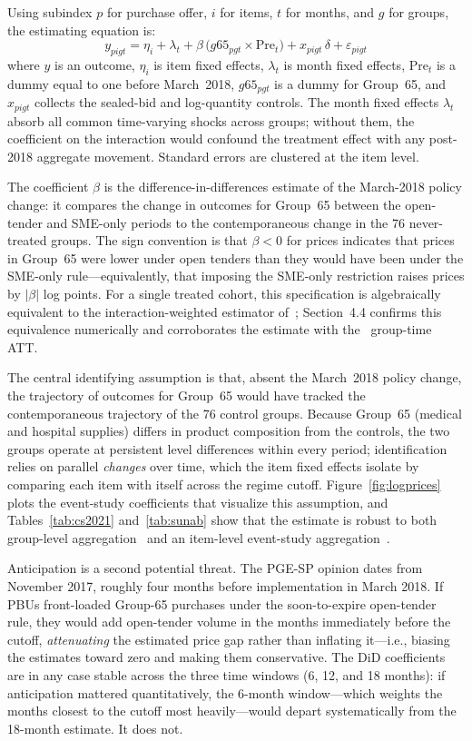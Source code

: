 Using subindex $p$ for purchase offer, $i$ for items, $t$ for months, and $g$ for groups, the estimating equation is:
\begin{equation}
y_{pigt} = \eta_i + \lambda_t + \beta\,\bigl(g65_{pgt}\times \text{Pre}_t\bigr) + x_{pigt}\,\delta + \varepsilon_{pigt}
\label{eq:did}
\end{equation}
where $y$ is an outcome, $\eta_i$ is item fixed effects, $\lambda_t$ is month fixed effects, $\text{Pre}_t$ is a dummy equal to one before March~2018, $g65_{pgt}$ is a dummy for Group~65, and $x_{pigt}$ collects the sealed-bid and log-quantity controls. The month fixed effects $\lambda_t$ absorb all common time-varying shocks across groups; without them, the coefficient on the interaction would confound the treatment effect with any post-2018 aggregate movement. Standard errors are clustered at the item level.

The coefficient $\beta$ is the difference-in-differences estimate of the March-2018 policy change: it compares the change in outcomes for Group~65 between the open-tender and SME-only periods to the contemporaneous change in the 76 never-treated groups. The sign convention is that $\beta < 0$ for prices indicates that prices in Group~65 were lower under open tenders than they would have been under the SME-only rule---equivalently, that imposing the SME-only restriction raises prices by $|\beta|$ log points. For a single treated cohort, this specification is algebraically equivalent to the interaction-weighted estimator of~\citet{sun2021}; Section~4.4 confirms this equivalence numerically and corroborates the estimate with the~\citet{callaway2021} group-time ATT.

The central identifying assumption is that, absent the March~2018 policy change, the trajectory of outcomes for Group~65 would have tracked the contemporaneous trajectory of the 76 control groups. Because Group~65 (medical and hospital supplies) differs in product composition from the controls, the two groups operate at persistent level differences within every period; identification relies on parallel \emph{changes} over time, which the item fixed effects isolate by comparing each item with itself across the regime cutoff. Figure~\ref{fig:logprices} plots the event-study coefficients that visualize this assumption, and Tables~\ref{tab:cs2021} and~\ref{tab:sunab} show that the estimate is robust to both group-level aggregation~\citep{callaway2021} and an item-level event-study aggregation~\citep{sun2021}.

Anticipation is a second potential threat. The PGE-SP opinion dates from November 2017, roughly four months before implementation in March 2018. If PBUs front-loaded Group-65 purchases under the soon-to-expire open-tender rule, they would add open-tender volume in the months immediately before the cutoff, \emph{attenuating} the estimated price gap rather than inflating it---i.e., biasing the estimates toward zero and making them conservative. The DiD coefficients are in any case stable across the three time windows (6, 12, and 18 months): if anticipation mattered quantitatively, the 6-month window---which weights the months closest to the cutoff most heavily---would depart systematically from the 18-month estimate. It does not.

